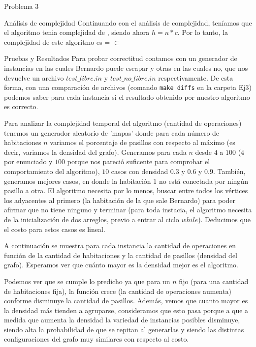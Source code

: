 \begin{section}{Problema 3}
\begin{subsection}{Análisis de complejidad}
		Continuando con el análisis de complejidad, teníamos que el algoritmo tenia complejidad de , siendo ahora $h=n*c$. Por lo tanto, la complejidad de este algoritmo es  =  $\subset$ 
	\end{subsection}


	\begin{subsection}{Pruebas y Resultados}
		Para probar correctitud contamos con un generador de instancias en las cuales Bernardo puede escapar y otras en las cuales no, que nos devuelve un archivo $test\_libre.in$ y $test\_no\_libre.in$ respectivamente. De esta forma, con una comparación de archivos (comando \texttt{make diffs} en la carpeta Ej3) podemos saber para cada instancia si el resultado obtenido por nuestro algoritmo es correcto.

		Para analizar la complejidad temporal del algoritmo (cantidad de operaciones) tenemos un generador aleatorio de 'mapas' donde para cada número de habitaciones $n$ variamos el porcentaje de pasillos con respecto al máximo (es decir, variamos la densidad del grafo). Generamos para cada $n$ desde $4$ a $100$ ($4$ por enunciado y $100$ porque nos pareció suficente para comprobar el comportamiento del algoritmo), $10$ casos con densidad $0.3$ y $0.6$ y $0.9$. También, generamos mejores casos, en donde la habitación $1$ no está conectada por ningún pasillo a otra. El algoritmo necesita por lo menos, buscar entre todos los vértices los adyacentes al primero (la habitación de la que sale Bernardo) para poder afirmar que no tiene ninguno y terminar (para toda instacia, el algoritmo necesita de la inicialización de dos arreglos, previo a entrar al ciclo $while$). Deducimos que el costo para estos casos es lineal.

		\newpage

		A continuación se muestra para cada instancia la cantidad de operaciones en función de la cantidad de habitaciones y la cantidad de pasillos (densidad del grafo). Esperamos ver que cuánto mayor es la densidad mejor es el algoritmo.
		

		Podemos ver que se cumple lo predicho ya que para un $n$ fijo (para una cantidad de habitaciones fija), la función crece (la cantidad de operaciones aumenta) conforme disminuye la cantidad de pasillos. 
		Además, vemos que cuanto mayor es la densidad más tienden a agruparse, consideramos que esto pasa porque a que a medida que aumenta la densidad la variedad de instancias posibles disminuye, siendo alta la probabilidad de que se repitan al generarlas y siendo las distintas configuraciones del grafo muy similares con respecto al costo.\VSP


\end{subsection}
\end{section}
